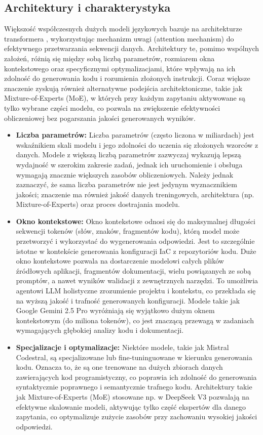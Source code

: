 \subsection{Architektury i charakterystyka}

Większość współczesnych dużych modeli językowych bazuje na architekturze transformera \cite{vaswani_attention_2023}, wykorzystując mechanizm uwagi (attention mechanism) do efektywnego przetwarzania sekwencji danych. Architektury te, pomimo wspólnych założeń, różnią się między sobą liczbą parametrów, rozmiarem okna kontekstowego oraz specyficznymi optymalizacjami, które wpływają na ich zdolność do generowania kodu i rozumienia złożonych instrukcji. Coraz większe znaczenie zyskują również alternatywne podejścia architektoniczne, takie jak Mixture-of-Experts (MoE), w których przy każdym zapytaniu aktywowane są tylko wybrane części modelu, co pozwala na zwiększenie efektywności obliczeniowej bez pogarszania jakości generowanych wyników.

\begin{itemize}
    \item \textbf{Liczba parametrów:} Liczba parametrów (często liczona w miliardach) jest wskaźnikiem skali modelu i jego zdolności do uczenia się złożonych wzorców z danych. Modele z większą liczbą parametrów zazwyczaj wykazują lepszą wydajność w szerokim zakresie zadań, jednak ich uruchomienie i obsługa wymagają znacznie większych zasobów obliczeniowych. Należy jednak zaznaczyć, że sama liczba parametrów nie jest jedynym wyznacznikiem jakości; znaczenie ma również jakość danych treningowych, architektura (np. Mixture-of-Experts) oraz proces dostrajania modelu.
    \item \textbf{Okno kontekstowe:} Okno kontekstowe odnosi się do maksymalnej długości sekwencji tokenów (słów, znaków, fragmentów kodu), którą model może przetworzyć i wykorzystać do wygenerowania odpowiedzi. Jest to szczególnie istotne w kontekście generowania konfiguracji IaC z repozytoriów kodu. Duże okno kontekstowe pozwala na dostarczenie modelowi całych plików źródłowych aplikacji, fragmentów dokumentacji, wielu powiązanych ze sobą promptów, a nawet wyników walidacji z zewnętrznych narzędzi. To umożliwia agentowi LLM holistyczne zrozumienie projektu i kontekstu, co przekłada się na wyższą jakość i trafność generowanych konfiguracji. Modele takie jak Google Gemini 2.5 Pro wyróżniają się wyjątkowo dużym oknem kontekstowym (do miliona tokenów), co jest znaczącą przewagą w zadaniach wymagających głębokiej analizy kodu i dokumentacji.
    \item \textbf{Specjalizacje i optymalizacje:} Niektóre modele, takie jak Mistral Codestral, są specjalizowane lub fine-tuninguowane w kierunku generowania kodu. Oznacza to, że są one trenowane na dużych zbiorach danych zawierających kod programistyczny, co poprawia ich zdolność do generowania syntaktycznie poprawnego i semantycznie trafnego kodu. Architektury takie jak Mixture-of-Experts (MoE) stosowane np. w DeepSeek V3 pozwalają na efektywne skalowanie modeli, aktywując tylko część ekspertów dla danego zapytania, co optymalizuje zużycie zasobów przy zachowaniu wysokiej jakości odpowiedzi.
\end{itemize}

